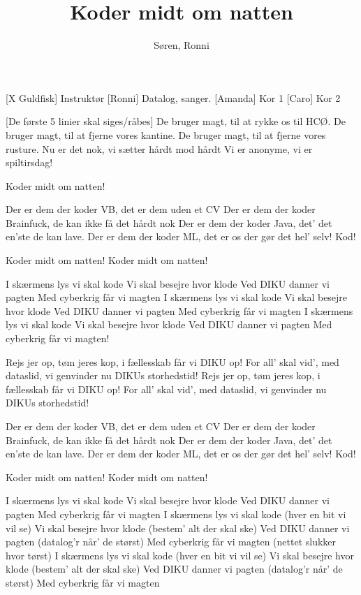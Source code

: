 \documentclass[a4paper,11pt]{article}
\title{Koder midt om natten}
\author{Søren, Ronni}
\begin{document}
\maketitle

\begin{roles}
  [X Guldfisk] Instruktør
	[Ronni] Datalog, sanger.
  [Amanda] Kor 1
  [Caro] Kor 2
\end{roles}

\begin{song}

[De første 5 linier skal siges/råbes]
De bruger magt, til at rykke os til HCØ.
De bruger magt, til at fjerne vores kantine.
De bruger magt, til at fjerne vores rusture.
Nu er det nok, vi sætter hårdt mod hårdt
Vi er anonyme, vi er spiltirsdag!

 Koder midt om natten!

 Der er dem der koder VB, det er dem uden et CV
Der er dem der koder Brainfuck, de kan ikke få det hårdt nok
Der er dem der koder Java, det' det en'ste de kan lave.
Der er dem der koder ML, det er os der gør det hel' selv!
Kod!

 Koder midt om natten!
Koder midt om natten!

 I skærmens lys vi skal kode
Vi skal besejre hvor klode
Ved DIKU danner vi pagten
Med cyberkrig får vi magten
I skærmens lys vi skal kode
Vi skal besejre hvor klode
Ved DIKU danner vi pagten
Med cyberkrig får vi magten
I skærmens lys vi skal kode
Vi skal besejre hvor klode
Ved DIKU danner vi pagten
Med cyberkrig får vi magten!

 Rejs jer op, tøm jeres kop, i fællesskab får vi DIKU op!
For all' skal vid', med dataslid, vi genvinder nu DIKUs storhedstid!
Rejs jer op, tøm jeres kop, i fællesskab får vi DIKU op!
For all' skal vid', med dataslid, vi genvinder nu DIKUs storhedstid!

 Der er dem der koder VB, det er dem uden et CV
Der er dem der koder Brainfuck, de kan ikke få det hårdt nok
Der er dem der koder Java, det' det en'ste de kan lave.
Der er dem der koder ML, det er os der gør det hel' selv!
Kod!

 Koder midt om natten!
Koder midt om natten!

 I skærmens lys vi skal kode
Vi skal besejre hvor klode
Ved DIKU danner vi pagten
Med cyberkrig får vi magten
I skærmens lys vi skal kode (hver en bit vi vil se)
Vi skal besejre hvor klode (bestem' alt der skal ske)
Ved DIKU danner vi pagten (datalog'r når' de størst)
Med cyberkrig får vi magten (nettet slukker hvor tørst)
I skærmens lys vi skal kode (hver en bit vi vil se)
Vi skal besejre hvor klode (bestem' alt der skal ske)
Ved DIKU danner vi pagten (datalog'r når' de størst)
Med cyberkrig får vi magten


\end{song}
\end{document}
